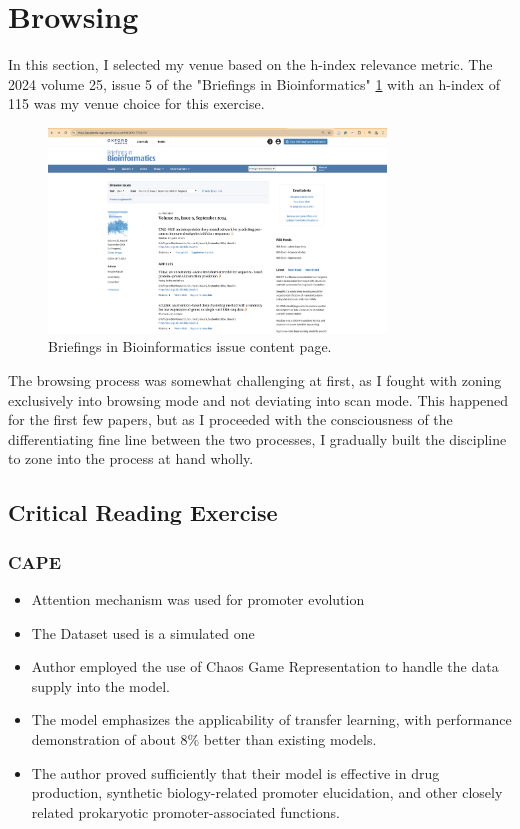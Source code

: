 \section{Browsing}
In this section, I selected my venue based on the h-index relevance metric. The 2024 volume 25, issue 5 of the "Briefings in Bioinformatics" \ref{BriB} with an h-index of 115 was my venue choice for this exercise.

\begin{figure}[h]
    \centering
    \includegraphics[width=0.8\textwidth]{images/J2Venue.png} 
    \caption{Briefings in Bioinformatics issue content page.}
    \label{BriB} 
\end{figure}

The browsing process was somewhat challenging at first, as I fought with zoning exclusively into browsing mode and not deviating into scan mode. This happened for the first few papers, but as I proceeded with the consciousness of the differentiating fine line between the two processes, I gradually built the discipline to zone into the process at hand wholly.

\subsection{Critical Reading Exercise}
\subsubsection{CAPE}
\begin{itemize}
    \item Attention mechanism was used for promoter evolution
    \item The Dataset used is a simulated one
    \item Author employed the use of Chaos Game Representation to handle the data supply into the model.
    \item The model emphasizes the applicability of transfer learning, with performance demonstration of about $8\%$ better than existing models.
    \item The author proved sufficiently that their model is effective in drug production, synthetic biology-related promoter elucidation, and other closely related prokaryotic promoter-associated functions.
\end{itemize}


